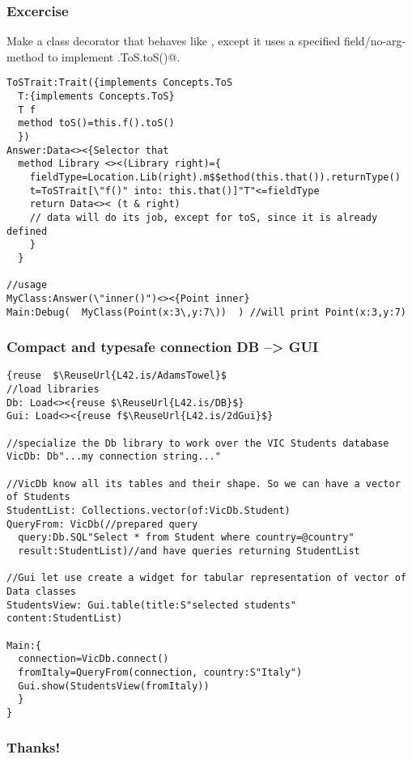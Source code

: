 \begin{frame}[fragile]
\frametitle{Excercise}
Make a class decorator that behaves like \Q@Data@, except it
uses a specified field/no-arg-method to implement \Q@Concepts.ToS.toS()@.
\begin{NiceCode}{59ex}{0.7}
\begin{lstlisting}
ToSTrait:Trait({implements Concepts.ToS
  T:{implements Concepts.ToS}
  T f
  method toS()=this.f().toS()
  })
Answer:Data<><{Selector that
  method Library <><(Library right)={
    fieldType=Location.Lib(right).m$$ethod(this.that()).returnType()
    t=ToSTrait[\"f()" into: this.that()]"T"<=fieldType
    return Data<>< (t & right) 
    // data will do its job, except for toS, since it is already defined
    }
  }

//usage
MyClass:Answer(\"inner()")<><{Point inner}
Main:Debug(  MyClass(Point(x:3\,y:7\))  ) //will print Point(x:3,y:7)
\end{lstlisting}
\end{NiceCode}
\end{frame}


\begin{frame}[fragile]
\frametitle{Compact and typesafe connection DB --> GUI}
\begin{NiceCode}{59ex}{0.7}
\begin{lstlisting}
{reuse  $\ReuseUrl{L42.is/AdamsTowel}$
//load libraries
Db: Load<><{reuse $\ReuseUrl{L42.is/DB}$}
Gui: Load<><{reuse f$\ReuseUrl{L42.is/2dGui}$}

//specialize the Db library to work over the VIC Students database
VicDb: Db"...my connection string..."

//VicDb know all its tables and their shape. So we can have a vector of Students
StudentList: Collections.vector(of:VicDb.Student)
QueryFrom: VicDb(//prepared query
  query:Db.SQL"Select * from Student where country=@country"
  result:StudentList)//and have queries returning StudentList

//Gui let use create a widget for tabular representation of vector of Data classes
StudentsView: Gui.table(title:S"selected students" content:StudentList)

Main:{
  connection=VicDb.connect()
  fromItaly=QueryFrom(connection, country:S"Italy")
  Gui.show(StudentsView(fromItaly))
  }
}
\end{lstlisting}
\end{NiceCode}
\end{frame}



\begin{frame}[fragile]
\frametitle{ Thanks! }
\end{frame}

